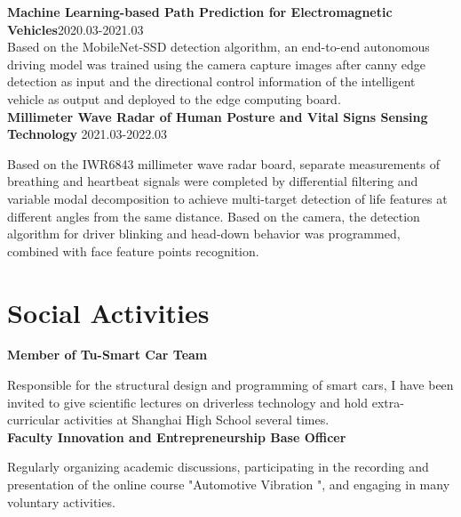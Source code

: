 \documentclass{resume}
\begin{document}
 \textbf{Machine Learning-based Path Prediction for Electromagnetic Vehicles}\hfill 2020.03-2021.03  \\
Based on the MobileNet-SSD detection algorithm, an end-to-end autonomous driving model was trained using the camera capture images after canny edge detection as input and the directional control information of the intelligent vehicle as output and deployed to the edge computing board. \\

 \textbf{Millimeter Wave Radar of Human Posture and Vital Signs Sensing Technology }\hfill2021.03-2022.03  

Based on the IWR6843 millimeter wave radar board, separate measurements of breathing and heartbeat signals were completed 
by differential filtering and variable modal decomposition to achieve multi-target detection of life features at different angles from the same distance. Based on the camera, the detection algorithm for driver blinking and head-down behavior was programmed, combined with face feature points recognition. 


\section{Social Activities}
\textbf{Member of Tu-Smart Car Team}  \par
Responsible for the structural design and programming of smart cars, I have been invited to give scientific lectures on
driverless technology and hold extra-curricular activities at Shanghai High School several times. \\

 \textbf{Faculty Innovation and Entrepreneurship Base Officer} \par
Regularly organizing academic discussions, participating in the recording and presentation of the online course "Automotive
Vibration ", and engaging in many voluntary activities.


%
%
\end{document}
